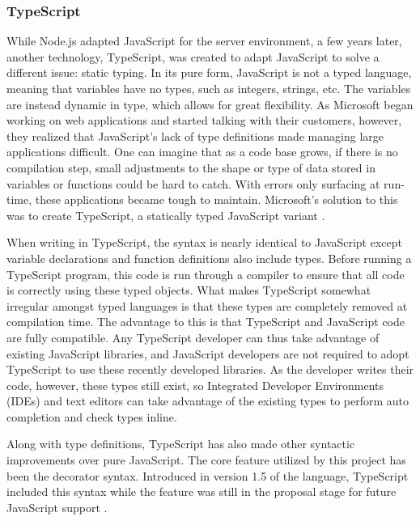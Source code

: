 \subsubsection{TypeScript} \label{sec:typescript}
While Node.js adapted JavaScript for the server environment, a few years later, another technology, TypeScript, was created to adapt JavaScript to solve a different issue: static typing.  In its pure form, JavaScript is not a typed language, meaning that variables have no types, such as integers, strings, etc.  The variables are instead dynamic in type, which allows for great flexibility.  As Microsoft began working on web applications and started talking with their customers, however, they realized that JavaScript's lack of type definitions made managing large applications difficult.  One can imagine that as a code base grows, if there is no compilation step, small adjustments to the shape or type of data stored in variables or functions could be hard to catch.  With errors only surfacing at run-time, these applications became tough to maintain.  Microsoft's solution to this was to create TypeScript, a statically typed JavaScript variant \cite{idgnewsservicestaffMicrosoftAugmentsJavaScript2012}.

When writing in TypeScript, the syntax is nearly identical to JavaScript except variable declarations and function definitions also include types.  Before running a TypeScript program, this code is run through a compiler to ensure that all code is correctly using these typed objects. What makes TypeScript somewhat irregular amongst typed languages is that these types are completely removed at compilation time. The advantage to this is that TypeScript and JavaScript code are fully compatible.  Any TypeScript developer can thus take advantage of existing JavaScript libraries, and JavaScript developers are not required to adopt TypeScript to use these recently developed libraries.  As the developer writes their code, however, these types still exist, so Integrated Developer Environments (IDEs) and text editors can take advantage of the existing types to perform auto completion and check types inline.

Along with type definitions, TypeScript has also made other syntactic improvements over pure JavaScript.  The core feature utilized by this project has been the decorator syntax.  Introduced in version 1.5 of the language, TypeScript included this syntax while the feature was still in the proposal stage for future JavaScript support \cite{turnerAnnouncingTypeScript2015}.

